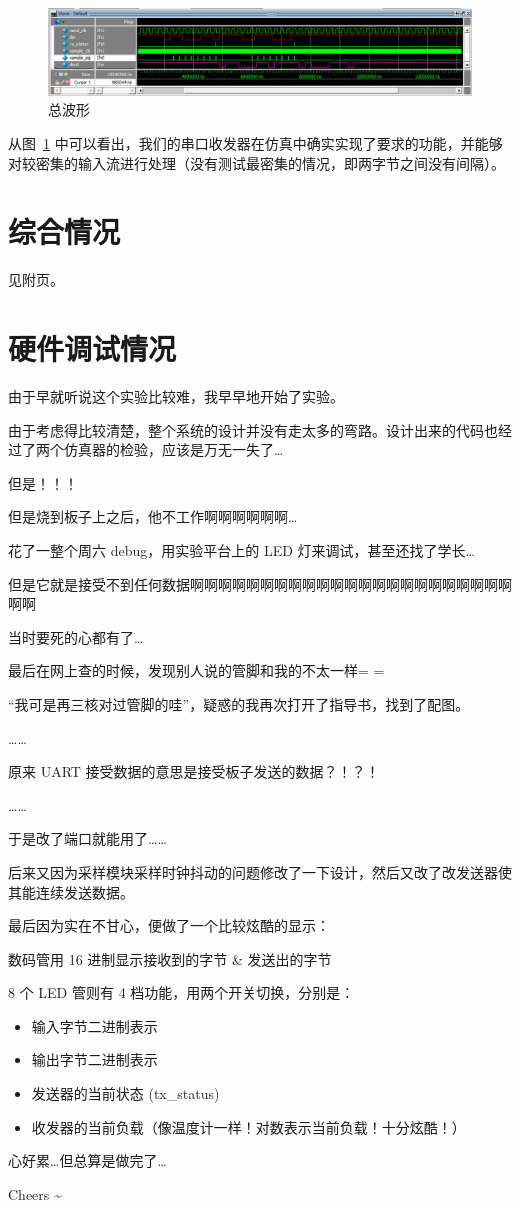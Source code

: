 \documentclass[11pt,a4paper]{article}
\begin{document}
\begin{figure}[htb]
  \centering
    \includegraphics[width=\textwidth]{exp4_wave}
  \caption{总波形}
  \label{fig:总波形}
\end{figure}

从图~\ref{fig:总波形} 中可以看出，我们的串口收发器在仿真中确实实现了要求的功能，并能够对较密集的输入流进行处理（没有测试最密集的情况，即两字节之间没有间隔）。


\section{综合情况}
见附页。

\section{硬件调试情况}
由于早就听说这个实验比较难，我早早地开始了实验。

由于考虑得比较清楚，整个系统的设计并没有走太多的弯路。设计出来的代码也经过了两个仿真器的检验，应该是万无一失了…

但是！！！

但是烧到板子上之后，他不工作啊啊啊啊啊啊…

花了一整个周六 debug，用实验平台上的 LED 灯来调试，甚至还找了学长…

但是它就是接受不到任何数据啊啊啊啊啊啊啊啊啊啊啊啊啊啊啊啊啊啊啊啊啊啊啊啊啊

当时要死的心都有了…

最后在网上查的时候，发现别人说的管脚和我的不太一样= =

“我可是再三核对过管脚的哇”，疑惑的我再次打开了指导书，找到了配图。

……

原来 UART 接受数据的意思是接受板子发送的数据？！？！

……

于是改了端口就能用了……

后来又因为采样模块采样时钟抖动的问题修改了一下设计，然后又改了改发送器使其能连续发送数据。

最后因为实在不甘心，便做了一个比较炫酷的显示：

数码管用 16 进制显示接收到的字节 \& 发送出的字节

8 个 LED 管则有 4 档功能，用两个开关切换，分别是：

\begin{itemize}
  \item 输入字节二进制表示
  \item 输出字节二进制表示
  \item 发送器的当前状态 (tx\_status)
  \item 收发器的当前负载（像温度计一样！对数表示当前负载！十分炫酷！）
\end{itemize}

心好累…但总算是做完了…

Cheers \textasciitilde


\end{document}
